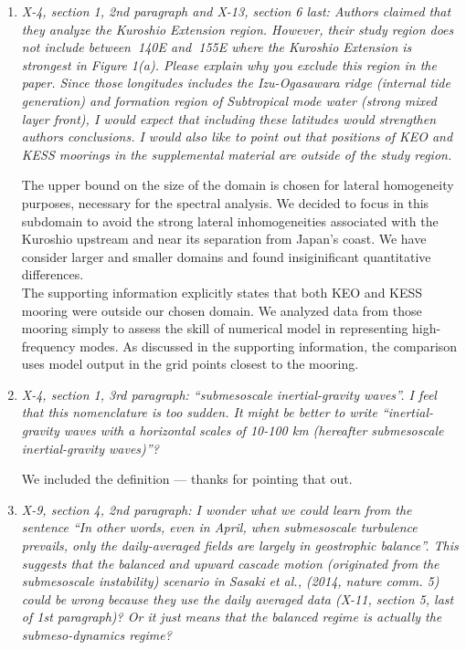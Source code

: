 \documentclass[11pt]{article}
\newcommand{\bdp}{\begin{description}}
\newcommand{\edp}{\end{description}}
\begin{document}
\begin{enumerate}

  \item {\it X-4, section 1, 2nd paragraph and X-13, section 6 last: Authors claimed that they
        analyze the Kuroshio Extension region. However, their study region does not
        include between $~$140E and $~$155E where the Kuroshio Extension is strongest in
        Figure 1(a). Please explain why you exclude this region in the paper. Since those
        longitudes includes the Izu-Ogasawara ridge (internal tide generation) and
        formation region of Subtropical mode water (strong mixed layer front), I would
        expect that including these latitudes would strengthen authors conclusions. I
        would also like to point out that positions of KEO and KESS moorings in the
        supplemental material are outside of the study region.}\\

        \bdp
             The upper bound on
             the size of the domain is chosen for lateral homogeneity purposes,
             necessary for the spectral analysis. We decided to focus in
             this subdomain to avoid the strong lateral inhomogeneities associated
             with the Kuroshio upstream and near its separation from Japan's coast.
             We have consider larger and smaller domains and found insiginificant
             quantitative differences.\\

             The supporting information explicitly states that both KEO and KESS
             mooring were outside our chosen domain. We analyzed data from those
             mooring simply to assess the skill of numerical model in representing
             high-frequency modes. As discussed in the supporting information, the
             comparison uses model output in the grid points closest
             to the mooring.
        \edp

  \item {\it X-4, section 1, 3rd paragraph: “submesoscale inertial-gravity waves”. I feel that this
        nomenclature is too sudden. It might be better to write “inertial-gravity waves
        with a horizontal scales of 10-100 km (hereafter submesoscale inertial-gravity
        waves)”?}\\

        \bdp
          We included the definition --- thanks for pointing that out.
        \edp

  \item {\it X-9, section 4, 2nd paragraph: I wonder what we could learn from the sentence “In
          other words, even in April, when submesoscale turbulence prevails, only the
          daily-averaged fields are largely in geostrophic balance”. This suggests that the
          balanced and upward cascade motion (originated from the submesoscale
          instability) scenario in Sasaki et al., (2014, nature comm. 5) could be wrong
          because they use the daily averaged data (X-11, section 5, last of 1st paragraph)?
          Or it just means that the balanced regime is actually the submeso-dynamics
          regime?}\\


\end{enumerate}
\end{document}

